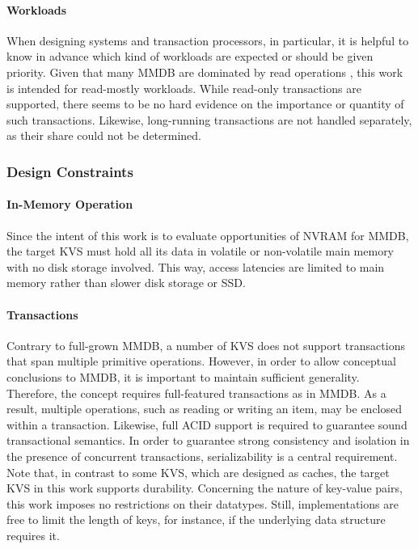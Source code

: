 \paragraph{Workloads}

When designing systems and transaction processors, in particular, it is helpful
to know in advance which kind of workloads are expected or should be given
priority. Given that many \ac{MMDB} are dominated by read operations
\cite{andrei2017sap}, this work is intended for read-mostly workloads. While
read-only transactions are supported, there seems to be no hard evidence on the
importance or quantity of such transactions. Likewise, long-running transactions
are not handled separately, as their share could not be determined.

\subsubsection{Design Constraints}

\paragraph{In-Memory Operation}

Since the intent of this work is to evaluate opportunities of \ac{NVRAM} for
\ac{MMDB}, the target \ac{KVS} must hold all its data in volatile or
non-volatile main memory with no disk storage involved. This way, access
latencies are limited to main memory rather than slower disk storage or
\ac{SSD}.

\paragraph{Transactions}

Contrary to full-grown \ac{MMDB}, a number of \ac{KVS} does not support
transactions that span multiple primitive operations. However, in order to allow
conceptual conclusions to \ac{MMDB}, it is important to maintain sufficient
generality. Therefore, the concept requires full-featured transactions as in
\ac{MMDB}. As a result, multiple operations, such as reading or writing an item,
may be enclosed within a transaction. Likewise, full ACID support is required to
guarantee sound transactional semantics. In order to guarantee strong
consistency and isolation in the presence of concurrent transactions,
serializability is a central requirement. Note that, in contrast to some
\ac{KVS}, which are designed as caches, the target \ac{KVS} in this work
supports durability. Concerning the nature of key-value pairs, this work imposes
no restrictions on their datatypes. Still, implementations are free to limit the
length of keys, for instance, if the underlying data structure requires it.


